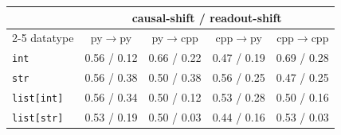 \begin{tabular}{lcccc}
\toprule
& \multicolumn{4}{c}{causal-shift / readout-shift} \\
\cmidrule(lr){2-5}
datatype & py$\to$py & py$\to$cpp & cpp$\to$py & cpp$\to$cpp \\
\midrule
\texttt{int} & 0.56 / 0.12 & 0.66 / 0.22 & 0.47 / 0.19 & 0.69 / 0.28 \\
\texttt{str} & 0.56 / 0.38 & 0.50 / 0.38 & 0.56 / 0.25 & 0.47 / 0.25 \\
\texttt{list[int]} & 0.56 / 0.34 & 0.50 / 0.12 & 0.53 / 0.28 & 0.50 / 0.16 \\
\texttt{list[str]} & 0.53 / 0.19 & 0.50 / 0.03 & 0.44 / 0.16 & 0.53 / 0.03 \\
\bottomrule
\end{tabular}
